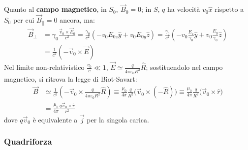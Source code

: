 \documentclass[a4paper]{scrartcl}
\numberwithin{equation}{subsection}
\theoremstyle{style1}
\begin{document}
Quanto al \textbf{campo magnetico}, in $S_0, \ \vec{B}_0 = 0$; in $S$, $q$ ha velocit\`a $v_0 \hat{x}$ rispetto a $S_0$ per cui $\vec{B}_{| | } =0 $ ancora, ma:
\begin{equation}
	\begin{split}
		\vec{B}_{\perp} &= \gamma_0 \frac{\vec{v}_0 \times \vec{E}_0}{c^2} = \frac{\gamma_0}{c^2} \left(-v_0E_{0z} \hat{y} + v_0E_{0y} \hat{z} \right) = \frac{\gamma_0}{c^2} \left(-v_0 \frac{E_z}{\gamma_0} \hat{y} + v_0 \frac{E_{y} }{\gamma_0}\hat{z} \right)   \\
		&=  \frac{1}{c^2}(-\vec{v}_0 \times \vec{E})
	\end{split}
\end{equation}
Nel limite non-relativistico $\frac{v_0}{c}\ll 1$, $\vec{E}\simeq \frac{q}{4\pi \varepsilon _0 R^2} \hat{R}$; sostituendolo nel campo magnetico, si ritrova la legge di Biot-Savart:
\begin{equation}
	\begin{split}
		\vec{B}&\simeq \frac{1}{c^2} \left(-\vec{v}_0 \times \frac{q}{4\pi \varepsilon _0  R^2}\hat{R}\right) \equiv \frac{\mu_0}{4 \pi} \frac{q}{R^2}\big(\vec{v}_0 \times (-\hat{R})\big) \equiv\frac{\mu_0}{4 \pi} \frac{q}{R^2}\big(\vec{v}_0 \times \hat{r}\big) \\
		& = \frac{\mu_0}{4\pi} \frac{q\vec{v}_0 \times \hat{r}}{r^2}
	\end{split}
\end{equation}
dove $q\vec{v}_0$ \`e equivalente a $\vec{j}$ per la singola carica. 
\subsubsection{Quadriforza}
\end{document}
